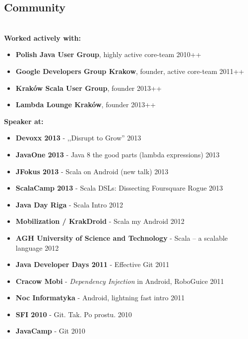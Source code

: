 \documentclass{res}
\begin{document}
\begin{resume}
\section{Community}
\\ 
\textbf{Worked actively with:}
\begin{itemize}
  \item \textbf{Polish Java User Group}, highly active core-team             \hfill 2010++
  \item \textbf{Google Developers Group Krakow}, founder, active core-team   \hfill 2011++
  \item \textbf{Kraków Scala User Group}, founder                            \hfill 2013++
  \item \textbf{Lambda Lounge Kraków}, founder                               \hfill 2013++
\end{itemize}
  
\textbf{Speaker at:}
\begin{itemize}
 \item \textbf{Devoxx 2013} - ,,Disrupt to Grow'' \hfill 2013
 \item \textbf{JavaOne 2013} - Java 8 the good parts (lambda expressions) \hfill 2013
 \item \textbf{JFokus 2013} - Scala on Android (new talk)    \hfill 2013
 \item \textbf{ScalaCamp 2013} - Scala DSLs: Dissecting Foursquare Rogue    \hfill 2013
 \item\textbf{Java Day Riga} - Scala Intro \hfill 2012
 \item \textbf{Mobilization / KrakDroid} - Scala my Android    \hfill 2012
 \item \textbf{AGH University of Science and Technology} - Scala -- a scalable language    \hfill 2012
 \item \textbf{Java Developer Days 2011} - Effective Git    \hfill 2011
 \item \textbf{Cracow Mobi} - \textit{Dependency Injection} in Android, RoboGuice    \hfill 2011
 \item \textbf{Noc Informatyka} - Android, lightning fast intro    \hfill 2011
 \item \textbf{SFI 2010} - Git. Tak. Po prostu.    \hfill 2010
 \item \textbf{JavaCamp} - Git    \hfill 2010
\end{itemize}



\end{resume}
\end{document}
